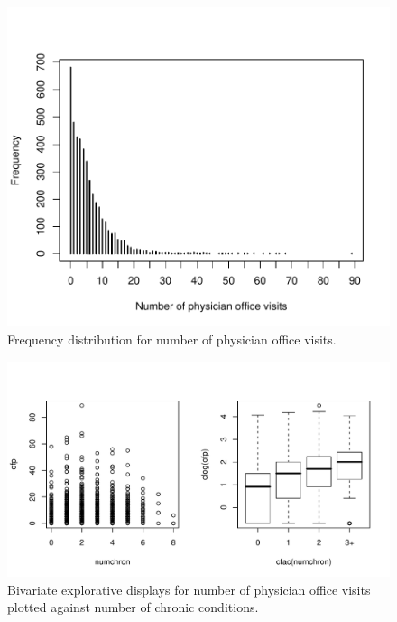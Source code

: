 \documentclass{Z}
\begin{document}
\begin{figure}[p]
\begin{center}
\includegraphics{countreg-ofp-plot2}
\caption{\label{fig:ofp} Frequency distribution for number of physician office visits.}
\end{center}
\end{figure}

\begin{figure}[p]
\begin{center}
\includegraphics{countreg-bad-good}
\caption{\label{fig:bad-good} Bivariate explorative displays for number of physician office visits
  plotted against number of chronic conditions.}
\end{center}
\end{figure}
\end{document}

